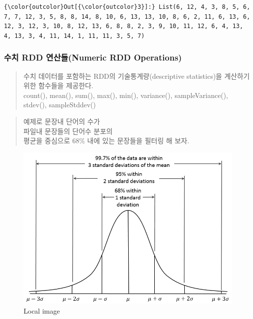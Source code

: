 \documentclass[11pt]{article}
\makeatletter
\def\maxwidth{\ifdim\Gin@nat@width>\linewidth\linewidth
    \else\Gin@nat@width\fi}
\let\Oldincludegraphics\includegraphics
\renewcommand{\includegraphics}[1]{\Oldincludegraphics[width=.8\maxwidth]{#1}}
\makeatother
\begin{document}
            \begin{Verbatim}[commandchars=\\\{\}]
{\color{outcolor}Out[{\color{outcolor}3}]:} List(6, 12, 4, 3, 8, 5, 6, 7, 7, 12, 3, 5, 8, 8, 14, 8, 10, 6, 13, 13, 10, 8, 6, 2, 11, 6, 13, 6, 12, 3, 12, 3, 10, 8, 12, 13, 6, 8, 8, 2, 3, 9, 10, 11, 12, 6, 4, 13, 4, 13, 3, 4, 11, 14, 1, 11, 11, 3, 5, 7)
\end{Verbatim}
        
    \subsubsection{수치 RDD 연산들(Numeric RDD
Operations)}\label{uxc218uxce58-rdd-uxc5f0uxc0b0uxb4e4numeric-rdd-operations}

    \begin{quote}
수치 데이터를 포함하는 RDD의 기술통계량(descriptive statistics)을
계산하기 위한 함수들을 제공한다.\\count(), mean(), sum(), max(), min(),
variance(), sampleVariance(), stdev(), sampleStddev()
\end{quote}

    \begin{quote}
예제로 문장내 단어의 수가\\파일내 문장들의 단어수 분포의\\평균을
중심으로 68\% 내에 있는 문장들을 필터링 해 보자.
\end{quote}

    \begin{figure}[htbp]
\centering
\includegraphics{./_images/Empirical_Rule.PNG}
\caption{Local image}
\end{figure}
\end{document}
